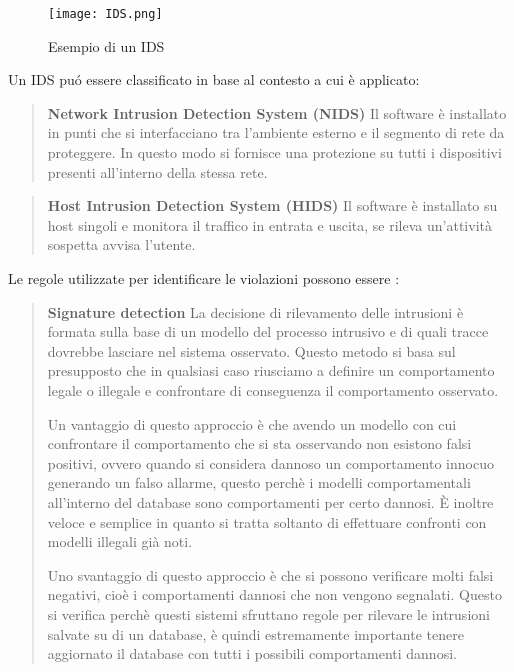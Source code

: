 \documentclass[../main.tex]{subfiles}
\begin{document}
\begin{figure}[H]
				\centering
				\texttt{[image: IDS.png]}
				\caption{Esempio di un IDS}
\end{figure}

Un IDS puó essere classificato in base al contesto a cui è applicato:

\begin{verse}
				\textbf{Network Intrusion Detection System (NIDS)} Il software è installato in punti che si interfacciano tra l'ambiente esterno e il segmento di rete da proteggere. In questo modo si fornisce una protezione su tutti i dispositivi presenti all'interno della stessa rete.
\end{verse}

\begin{verse}
				\textbf{Host Intrusion Detection System (HIDS)} Il software è installato su host singoli e monitora il traffico in entrata e uscita, se rileva un'attività sospetta avvisa l'utente.
\end{verse}

Le regole utilizzate per identificare le violazioni possono essere \cite{IDS}:

\begin{verse}
				\textbf{Signature detection} La decisione di rilevamento delle intrusioni è formata sulla base di un modello del processo intrusivo e di quali tracce dovrebbe lasciare nel sistema osservato. Questo metodo si basa sul presupposto che in qualsiasi caso riusciamo a definire un comportamento legale o illegale e confrontare di conseguenza il comportamento osservato.

				Un vantaggio di questo approccio è che avendo un modello con cui confrontare il comportamento che si sta osservando non esistono falsi positivi, ovvero quando si considera dannoso un comportamento innocuo generando un falso allarme, questo perchè i modelli comportamentali all'interno del database sono comportamenti per certo dannosi. È inoltre veloce e semplice in quanto si tratta soltanto di effettuare confronti con modelli illegali già noti.

				Uno svantaggio di questo approccio è che si possono verificare molti falsi negativi, cioè i comportamenti dannosi che non vengono segnalati. Questo si verifica perchè questi sistemi sfruttano regole per rilevare le intrusioni salvate su di un database, è quindi estremamente importante tenere aggiornato il database con tutti i possibili comportamenti dannosi.
\end{verse}
\end{document}
